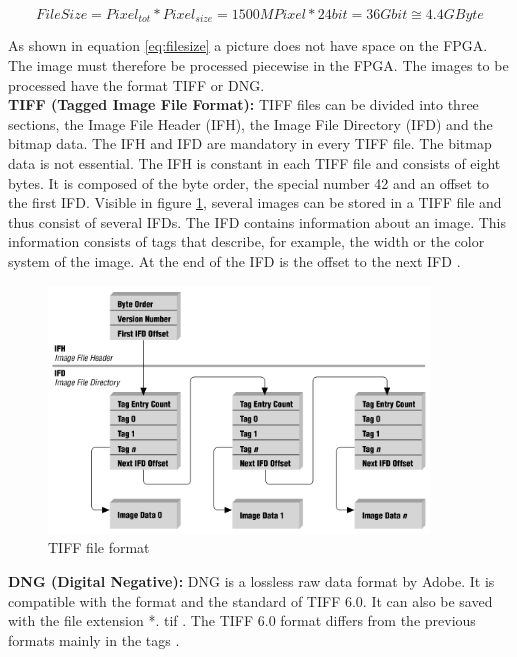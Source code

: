 \begin{equation}
	File Size = Pixel_{tot} * Pixel_{size} = 1500MPixel * 24bit = 36Gbit \cong 4.4GByte
    \label{eq:filesize}
\end{equation}

As shown in equation \ref{eq:filesize} a picture does not have space on the FPGA. The image must therefore be processed piecewise in the FPGA. 
The images to be processed have the format TIFF or DNG. 
\\

\textbf{TIFF (Tagged Image File Format):}
TIFF files can be divided into three sections, the Image File Header (IFH), the Image File Directory (IFD) and the bitmap data. The IFH and  IFD are mandatory in every TIFF file. The bitmap data is not essential. 
The IFH is constant in each TIFF file and consists of eight bytes. It is composed of the byte order, the special number 42 and an offset to the first IFD.
Visible in figure \ref{fig:tiff_format}, several images can be stored in a TIFF file and thus consist of several IFDs. The IFD contains information about an image. This information consists of tags that describe, for example, the width or the color system of the image. At the end of the IFD is the offset to the next IFD \cite{tiff_format}.
\\

\begin{figure}[tb!]
    \centering
    \includegraphics[width=0.9\textwidth]{images/mission/tiff_format.png}
    \caption{TIFF file format \cite{tiff_format}}
    \label{fig:tiff_format}
\end{figure}

\textbf{DNG (Digital Negative):}
DNG is a lossless raw data format by Adobe. It is compatible with the format and the standard of TIFF 6.0. It can also be saved with the file extension *. tif \cite{dng_format}. 
The TIFF 6.0 format differs from the previous formats mainly in the tags \cite{tiff_format}.

